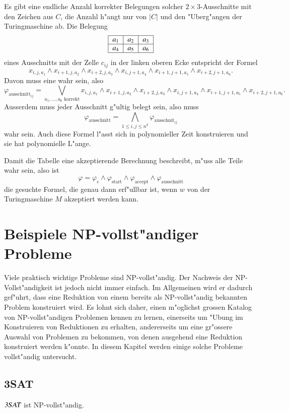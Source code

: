 Es gibt eine endliche Anzahl korrekter Belegungen solcher
$2\times 3$-Ausschnitte mit den Zeichen aus $C$, die Anzahl
h"angt nur von $|C|$ und den "Uberg"angen der Turingmaschine ab.
Die Belegung
\[
\begin{tabular}{|c|c|c|}
\hline
$a_1$&$a_2$&$a_3$\\
\hline
$a_4$&$a_5$&$a_6$\\
\hline
\end{tabular}
\]
eines Ausschnitts mit der Zelle $c_{ij}$ in der
linken oberen Ecke entspricht der Formel
\[
x_{i,j,a_1}\wedge
x_{i+1,j,a_2}\wedge
x_{i+2,j,a_3}\wedge
x_{i,j+1,a_4}\wedge
x_{i+1,j+1,a_5}\wedge
x_{i+2,j+1,a_6}.
\]
Davon muss eine wahr sein, also
\[
\varphi_{\text{ausschnitt}_{ij}}
=
\bigvee_{\text{$a_1,\dots,a_6$ korrekt}}
x_{i,j,a_1}\wedge
x_{i+1,j,a_2}\wedge
x_{i+2,j,a_3}\wedge
x_{i,j+1,a_4}\wedge
x_{i+1,j+1,a_5}\wedge
x_{i+2,j+1,a_6}.
\]
Ausserdem muss jeder Ausschnitt g"ultig belegt sein, also
muss
\[
\varphi_{\text{ausschnitt}} =\bigwedge_{1\le i,j\le n^k}\varphi_{\text{ausschnit}_{ij}}
\]
wahr sein. Auch diese Formel l"asst sich in polynomieller Zeit konstruieren
und sie hat polynomielle L"ange.

Damit die Tabelle eine akzeptierende Berechnung beschreibt, m"uss
alle Teile wahr sein, also ist
\[
\varphi =
\varphi_{c}\wedge
\varphi_{\text{start}}\wedge
\varphi_{\text{accept}}\wedge
\varphi_{\text{ausschnitt}}
\]
die gesuchte Formel, die genau dann erf"ullbar ist, wenn $w$ von der
Turingmaschine $M$ akzeptiert werden kann.

\section{Beispiele NP-vollst"andiger Probleme}
Viele praktisch wichtige Probleme sind NP-vollst"andig. Der Nachweis
der NP-Vollst"andigkeit ist jedoch nicht immer einfach. Im Allgemeinen
wird er dadurch gef"uhrt, dass eine Reduktion von einem bereits als
NP-vollst"andig bekannten Problem konstruiert wird. Es lohnt sich
daher, einen m"oglichst grossen Katalog von NP-vollst"andigen
Problemen kennen zu lernen, einerseits um "Ubung im Konstruieren
von Reduktionen zu erhalten, andererseits um eine gr"ossere Auswahl 
von Problemen zu bekommen, von denen ausgehend eine Reduktion 
konstruiert werden k"onnte. In diesem Kapitel werden einige
solche Probleme vollst"andig untersucht.
\subsection{3SAT}
\begin{satz}
$\text{\textsl{3SAT}}$ ist NP-vollst"andig.
\end{satz}

